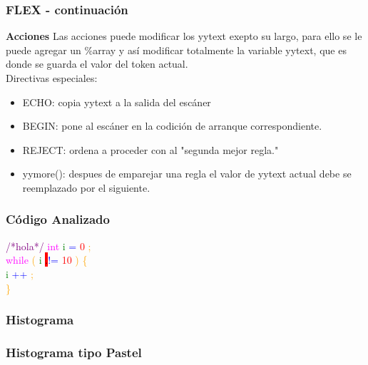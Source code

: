 \documentclass{beamer}
\begin{document}
\begin{frame}
\frametitle{FLEX - continuaci\'on} 
\textbf{Acciones} \newline 
Las acciones puede modificar los yytext exepto su largo, para ello se le puede agregar un \%array y as\'i modificar totalmente la variable yytext, que es donde se guarda el valor del token actual.\\Directivas especiales:\begin{itemize} \item ECHO: copia yytext a la salida del esc\'aner  \item BEGIN: pone al esc\'aner en la codici\'on de arranque correspondiente. \item REJECT: ordena a proceder con al "segunda mejor regla." \item yymore(): despues de emparejar una regla el valor de yytext actual debe se reemplazado por el siguiente.\end{itemize}\end{frame}
\begin{frame}
\frametitle{C\'odigo Analizado}
\textcolor{purple}{/*hola*/} \textcolor{magenta}{int} \textcolor{green}{i} \textcolor{blue}{=} \textcolor{red}{0} \textcolor{orange}{;} \\ 
 \textcolor{magenta}{while} \textcolor{orange}{(} \textcolor{green}{i} \colorbox{red}{.}\textcolor{blue}{!=} \textcolor{red}{10} \textcolor{orange}{)} \textcolor{orange}{\{} \\ 
 \textcolor{green}{i} \textcolor{blue}{++} \textcolor{orange}{;} \\ 
 \textcolor{orange}{\}} \\ 
 \textcolor{white}{} \end{frame}
\begin{frame}
\frametitle{Histograma}
\end{frame}
\begin{frame}
\frametitle{Histograma tipo Pastel}
\def\angle{0}
\def\radius{3}
\def\cyclelist{{"yellow","blue","red","green"}}
\newcount\cyclecount {}
\newcount\ind {}

\end{frame}
\end{document}
